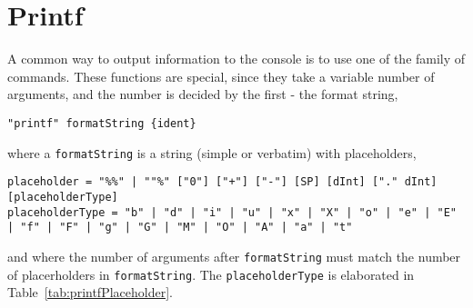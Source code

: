 \section{Printf}
\label{sec:printf}
A common way to output information to the console is to use one of the family of  commands. These functions are special, since they take a variable number of arguments, and the number is decided by the first - the format string,
\begin{lstlisting}[language=ebnf]
"printf" formatString {ident}
\end{lstlisting}
where a \lstinline[language=ebnf]!formatString! is a string (simple or verbatim) with placeholders,
\begin{lstlisting}[language=ebnf]
placeholder = "%%" | ""%" ["0"] ["+"] ["-"] [SP] [dInt] ["." dInt] [placeholderType]
placeholderType = "b" | "d" | "i" | "u" | "x" | "X" | "o" | "e" | "E" | "f" | "F" | "g" | "G" | "M" | "O" | "A" | "a" | "t"
\end{lstlisting}
and where the number of arguments after \lstinline[language=ebnf]!formatString! must match the number of placerholders in \lstinline[language=ebnf]!formatString!. The \lstinline[language=ebnf]!placeholderType! is elaborated in Table~\ref{tab:printfPlaceholder}.
